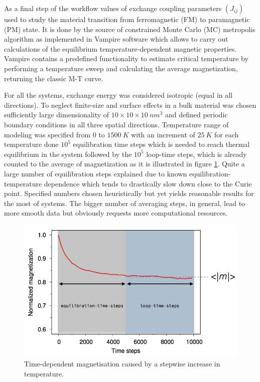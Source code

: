 As a final step of the workflow values of exchange coupling parameters $(J_{ij})$ used to study the material transition from ferromagnetic (FM) to paramagnetic (PM) state. It is done by the source of constrained Monte Carlo (MC) metropolis algorithm as implemented in Vampire software which allows to carry out calculations of the equilibrium temperature-dependent magnetic properties. Vampire contains a predefined functionality to estimate critical temperature by performing a temperature sweep and calculating the average magnetization, returning the classic M-T curve.

For all the systems, exchange energy was considered isotropic (equal in all directions). To neglect finite-size and surface effects in a bulk material was chosen sufficiently large dimensionality of $10 \times 10 \times 10\ nm^3$ and defined periodic boundary conditions in all three spatial directions.  Temperature range of modeling was specified from $0$ to $1500\ K$ with an increment of $25\ K$ for each temperature done $10^5$ equilibration time steps which is needed to reach thermal equilibrium in the system followed by the $10^5$ loop-time steps, which is already counted to the average of magnetization as it is illustrated in figure \ref{fig:time_magnetization}.  Quite a large number of equilibration steps explained due to known equilibration-temperature dependence which tends to drastically slow down close to the Curie point. Specified numbers chosen heuristically but yet yields reasonable results for the most of systems.
The bigger number of averaging steps, in general, lead to more smooth data but obviously requests more computational resources.

\begin{figure}[H]
\centering
\captionsetup{justification=centering,margin=2cm}
\includegraphics[width=120mm]{fig/dft_fig/time_magnetization.png}
\caption[Time-dependent magnetisation caused by a stepwise increase in temperature.]{Time-dependent magnetisation caused by a stepwise increase in temperature.}
\label{fig:time_magnetization}
\end{figure}

